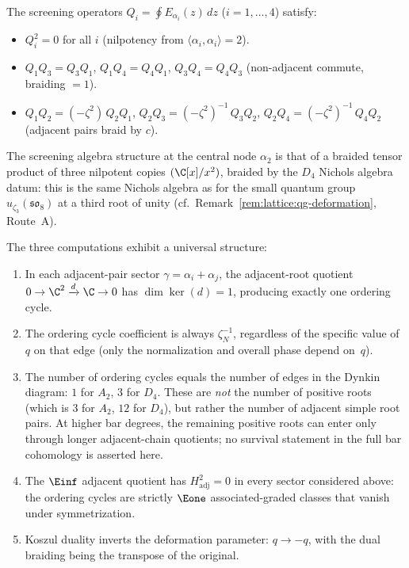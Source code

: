 \begin{computation}[\texorpdfstring{$D_4$}{D_4} at the Coxeter root: \texorpdfstring{$N = 3$}{N = 3}, triality]
The screening operators $Q_i = \oint E_{\alpha_i}(z)\,dz$
($i = 1, \ldots, 4$) satisfy:
\begin{itemize}
\item $Q_i^2 = 0$ for all $i$ (nilpotency from
 $\langle\alpha_i,\alpha_i\rangle = 2$).
\item $Q_1 Q_3 = Q_3 Q_1$, $Q_1 Q_4 = Q_4 Q_1$,
 $Q_3 Q_4 = Q_4 Q_3$ (non-adjacent commute, braiding $= 1$).
\item $Q_1 Q_2 = (-\zeta^2)\, Q_2 Q_1$,
 $Q_2 Q_3 = (-\zeta^2)^{-1}\, Q_3 Q_2$,
 $Q_2 Q_4 = (-\zeta^2)^{-1}\, Q_4 Q_2$
 (adjacent pairs braid by $c$).
\end{itemize}
The screening algebra structure at the central node $\alpha_2$ is that
of a braided tensor product of three nilpotent copies $(\C[x]/x^2)$,
braided by the $D_4$ Nichols algebra datum: this is the same Nichols
algebra as for the small quantum group $u_{\zeta_3}(\mathfrak{so}_8)$
at a third root of unity
(cf.\ Remark~\ref{rem:lattice:qg-deformation}, Route~A).
\end{computation}

\begin{remark}
\label{rem:lattice:e1-pattern}
The three computations exhibit a universal structure:
\begin{enumerate}[label=(\roman*)]
\item In each adjacent-pair sector $\gamma = \alpha_i + \alpha_j$,
the adjacent-root quotient
$0 \to \C^2 \xrightarrow{d} \C \to 0$ has
$\dim\ker(d) = 1$, producing exactly one ordering cycle.
\item The ordering cycle coefficient is always $\zeta_N^{-1}$,
regardless of the specific value of $q$ on that edge
\textup{(}only the normalization and overall phase depend on~$q$\textup{)}.
\item The number of ordering cycles equals the number of edges in the
Dynkin diagram: $1$ for $A_2$, $3$ for $D_4$. These are \emph{not}
the number of positive roots
(which is $3$ for $A_2$, $12$ for $D_4$),
but rather the number of adjacent simple root pairs. At higher bar
degrees, the remaining positive roots can enter only through longer
adjacent-chain quotients; no survival statement in the full bar
cohomology is asserted here.
\item The $\Einf$ adjacent quotient has $H^2_{\mathrm{adj}} = 0$ in
every sector considered above: the ordering cycles are strictly
$\Eone$ associated-graded classes that vanish under symmetrization.
\item Koszul duality inverts the deformation parameter: $q \to -q$,
with the dual braiding being the transpose of the original.
\end{enumerate}
\end{remark}


